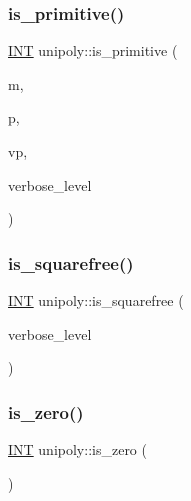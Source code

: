\subsubsection{\texorpdfstring{is\+\_\+primitive()}{is\_primitive()}}
{\footnotesize\ttfamily \mbox{\hyperlink{galois_8h_a09fddde158a3a20bd2dcadb609de11dc}{I\+NT}} unipoly\+::is\+\_\+primitive (\begin{DoxyParamCaption}\item[{\mbox{\hyperlink{galois_8h_a09fddde158a3a20bd2dcadb609de11dc}{I\+NT}}}]{m,  }\item[{\mbox{\hyperlink{galois_8h_a09fddde158a3a20bd2dcadb609de11dc}{I\+NT}}}]{p,  }\item[{\mbox{\hyperlink{class_vector}{Vector}} \&}]{vp,  }\item[{\mbox{\hyperlink{galois_8h_a09fddde158a3a20bd2dcadb609de11dc}{I\+NT}}}]{verbose\+\_\+level }\end{DoxyParamCaption})}

\mbox{\label{classunipoly_ac7b4a759fa68858043e1ad2b91e060db}} 
\subsubsection{\texorpdfstring{is\+\_\+squarefree()}{is\_squarefree()}}
{\footnotesize\ttfamily \mbox{\hyperlink{galois_8h_a09fddde158a3a20bd2dcadb609de11dc}{I\+NT}} unipoly\+::is\+\_\+squarefree (\begin{DoxyParamCaption}\item[{\mbox{\hyperlink{galois_8h_a09fddde158a3a20bd2dcadb609de11dc}{I\+NT}}}]{verbose\+\_\+level }\end{DoxyParamCaption})}

\mbox{\label{classunipoly_a7bff4146466929655bf2bcfd42c682cf}} 
\subsubsection{\texorpdfstring{is\+\_\+zero()}{is\_zero()}}
{\footnotesize\ttfamily \mbox{\hyperlink{galois_8h_a09fddde158a3a20bd2dcadb609de11dc}{I\+NT}} unipoly\+::is\+\_\+zero (\begin{DoxyParamCaption}{ }\end{DoxyParamCaption})\hspace{0.3cm}{\ttfamily [virtual]}}



